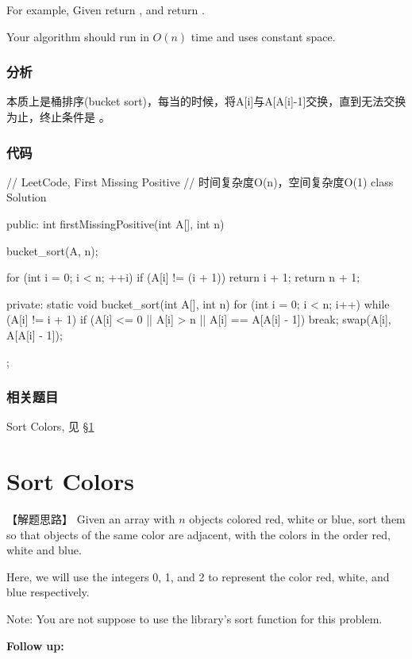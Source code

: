 For example,
Given \fn{[1,2,0]} return ,
and \fn{[3,4,-1,1]} return .

Your algorithm should run in $O(n)$ time and uses constant space.


\subsubsection{分析}
本质上是桶排序(bucket sort)，每当的时候，将A[i]与A[A[i]-1]交换，直到无法交换为止，终止条件是 。


\subsubsection{代码}
\begin{Code}
	// LeetCode, First Missing Positive
	// 时间复杂度O(n)，空间复杂度O(1)
	class Solution {
		public:
		int firstMissingPositive(int A[], int n) {
			bucket_sort(A, n);
			
			for (int i = 0; i < n; ++i)
			if (A[i] != (i + 1))
			return i + 1;
			return n + 1;
		}
		private:
		static void bucket_sort(int A[], int n) {
			for (int i = 0; i < n; i++) {
				while (A[i] != i + 1) {
					if (A[i] <= 0 || A[i] > n || A[i] == A[A[i] - 1])
					break;
					swap(A[i], A[A[i] - 1]);
				}
			}
		}
	};
\end{Code}


\subsubsection{相关题目}
\begindot
\item Sort Colors, 见 \S \ref{sec:sort-colors}
\myenddot


\section{Sort Colors} %
\label{sec:sort-colors}


【解题思路】
Given an array with $n$ objects colored red, white or blue, sort them so that objects of the same color are adjacent, with the colors in the order red, white and blue.

Here, we will use the integers 0, 1, and 2 to represent the color red, white, and blue respectively.

Note:
You are not suppose to use the library's sort function for this problem.

\textbf{Follow up:}

